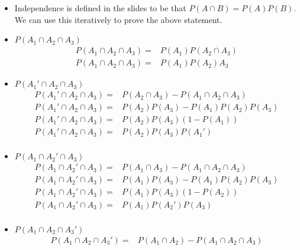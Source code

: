 \documentclass{article}
\begin{document}
\begin{enumerate}
    \begin{itemize}
    \item Independence is defined in the slides to be that $P(A \cap B) = P(A)P(B)$. We can use this iteratively to prove the above statement.
    \item $P(A_1 \cap A_2 \cap A_3)$
        \begin{equation}
        \begin{aligned}
        P(A_1 \cap A_2 \cap A_3) = & P(A_1) P(A_2 \cap A_3) \\
        P(A_1 \cap A_2 \cap A_3) = & P(A_1) P(A_2) A_3
        \end{aligned}
        \end{equation}
    \item $P(A_1' \cap A_2 \cap A_3)$
        \begin{equation}
        \begin{aligned}
        P(A_1' \cap A_2 \cap A_3) = & P(A_2 \cap A_3) - P(A_1 \cap A_2 \cap A_3) \\
        P(A_1' \cap A_2 \cap A_3) = & P(A_2) P(A_3) - P(A_1) P(A_2) P(A_3) \\
        P(A_1' \cap A_2 \cap A_3) = & P(A_2) P(A_3) (1 - P(A_1)) \\
        P(A_1' \cap A_2 \cap A_3) = & P(A_2) P(A_3) P(A_1') \\
        \end{aligned}
        \end{equation}
    \item $P(A_1 \cap A_2' \cap A_3)$
        \begin{equation}
        \begin{aligned}
        P(A_1 \cap A_2' \cap A_3) = & P(A_1 \cap A_3) - P(A_1 \cap A_2 \cap A_3) \\
        P(A_1 \cap A_2' \cap A_3) = & P(A_1) P(A_3) - P(A_1) P(A_2) P(A_3) \\
        P(A_1 \cap A_2' \cap A_3) = & P(A_1) P(A_3) (1 - P(A_2)) \\
        P(A_1 \cap A_2' \cap A_3) = & P(A_1) P(A_2') P(A_3) \\
        \end{aligned}
        \end{equation}
    \item $P(A_1 \cap A_2 \cap A_3')$
        \begin{equation}
        \begin{aligned}
        P(A_1 \cap A_2 \cap A_3') = & P(A_1 \cap A_2) - P(A_1 \cap A_2 \cap A_3) \\

\end{aligned}
\end{equation}
\end{itemize}
\end{enumerate}
\end{document}
